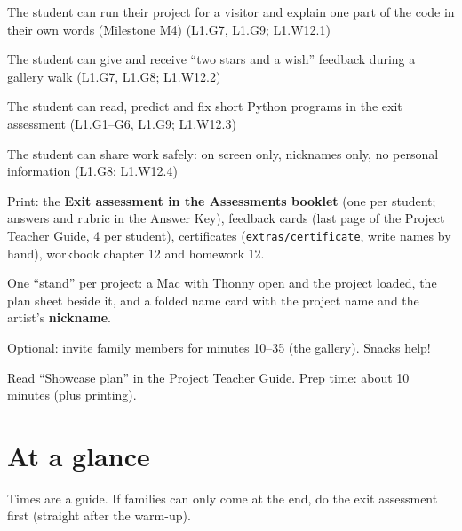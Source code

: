 
\begin{objectives}
  \item The student can run their project for a visitor and explain one part of the code in their own words (Milestone M4) (L1.G7, L1.G9; L1.W12.1)
  \item The student can give and receive \enquote{two stars and a wish} feedback during a gallery walk (L1.G7, L1.G8; L1.W12.2)
  \item The student can read, predict and fix short Python programs in the exit assessment (L1.G1--G6, L1.G9; L1.W12.3)
  \item The student can share work safely: on screen only, nicknames only, no personal information (L1.G8; L1.W12.4)
\end{objectives}

\begin{materials}
  \item Print: the \textbf{Exit assessment in the Assessments booklet} (one per student; answers and rubric in the Answer Key), feedback cards (last page of the Project Teacher Guide, 4 per student), certificates (\texttt{extras/certificate}, write names by hand), workbook chapter 12 and homework 12.
  \item One \enquote{stand} per project: a Mac with Thonny open and the project loaded, the plan sheet beside it, and a folded name card with the project name and the artist's \textbf{nickname}.
  \item Optional: invite family members for minutes 10--35 (the gallery). Snacks help!
  \item Read \enquote{Showcase plan} in the Project Teacher Guide. Prep time: about 10 minutes (plus printing).
\end{materials}

\section{At a glance}
Times are a guide. If families can only come at the end, do the exit assessment first (straight after the warm-up).
\begin{timeplan}
\end{timeplan}

